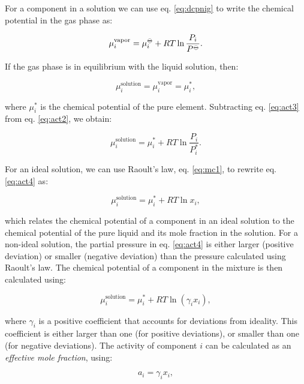\documentclass[
  9pt,
]{extbook}
\theoremstyle{definition}
\theoremstyle{definition}
\theoremstyle{definition}
\theoremstyle{definition}
\theoremstyle{remark}
\begin{document}
For a component in a solution we can use eq. \eqref{eq:dcpnig} to write the chemical potential in the gas phase as:

\begin{equation}
\mu_i^{\text{vapor}} = \mu_i^{{-\kern-6pt{\ominus}\kern-6pt-}} + RT \ln \frac{P_i}{P^{{-\kern-6pt{\ominus}\kern-6pt-}}}.
\label{eq:act2}
\end{equation}

If the gas phase is in equilibrium with the liquid solution, then:

\begin{equation}
\mu_i^{\text{solution}} = \mu_i^{\text{vapor}} = \mu_i^*,
\label{eq:act3}
\end{equation}

where \(\mu_i^*\) is the chemical potential of the pure element. Subtracting eq. \eqref{eq:act3} from eq. \eqref{eq:act2}, we obtain:

\begin{equation}
\mu_i^{\text{solution}} = \mu_i^* + RT \ln \frac{P_i}{P^*_i}.
\label{eq:act4}
\end{equation}

For an ideal solution, we can use Raoult's law, eq. \eqref{eq:mc1}, to rewrite eq. \eqref{eq:act4} as:

\begin{equation}
\mu_i^{\text{solution}} = \mu_i^* + RT \ln x_i,
\label{eq:act5}
\end{equation}

which relates the chemical potential of a component in an ideal solution to the chemical potential of the pure liquid and its mole fraction in the solution. For a non-ideal solution, the partial pressure in eq. \eqref{eq:act4} is either larger (positive deviation) or smaller (negative deviation) than the pressure calculated using Raoult's law. The chemical potential of a component in the mixture is then calculated using:

\begin{equation}
\mu_i^{\text{solution}} = \mu_i^* + RT \ln \left(\gamma_i x_i\right),
\label{eq:act6}
\end{equation}

where \(\gamma_i\) is a positive coefficient that accounts for deviations from ideality. This coefficient is either larger than one (for positive deviations), or smaller than one (for negative deviations). The activity of component \(i\) can be calculated as an \emph{effective mole fraction}, using:

\begin{equation}
a_i = \gamma_i x_i,
\label{eq:act7}
\end{equation}
\end{document}
